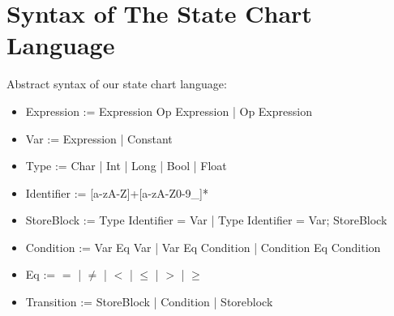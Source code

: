 \section{Syntax of The State Chart Language}

Abstract syntax of our state chart language:

\begin{itemize}
	\item Expression := Expression Op Expression | Op Expression
	\item Var := Expression | Constant
	\item Type := Char | Int | Long | Bool | Float
	\item Identifier := [a-zA-Z]+[a-zA-Z0-9_]*  
	
	\item StoreBlock := Type Identifier = Var | Type Identifier = Var; StoreBlock

	\item Condition := Var Eq Var | Var Eq Condition | Condition Eq Condition
	
	\item Eq := $=$ | $\neq$ | $<$ | $\leq$ | $>$ | $\geq$	
	
	\item Transition := StoreBlock | Condition | Storeblock
	
\end{itemize}